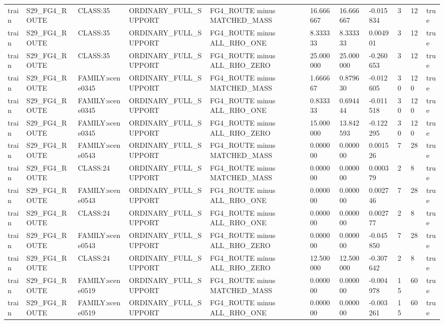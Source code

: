 \begin{tabular}{lllllllllll}
train & S29\_FG4\_ROUTE & CLASS:35 & ORDINARY\_FULL\_SUPPORT & FG4\_ROUTE minus MATCHED\_MASS & 16.666667 & 16.666667 & -0.015834 & 3 & 12 & true \\
train & S29\_FG4\_ROUTE & CLASS:35 & ORDINARY\_FULL\_SUPPORT & FG4\_ROUTE minus ALL\_RHO\_ONE & 8.333333 & 8.333333 & 0.004901 & 3 & 12 & true \\
train & S29\_FG4\_ROUTE & CLASS:35 & ORDINARY\_FULL\_SUPPORT & FG4\_ROUTE minus ALL\_RHO\_ZERO & 25.000000 & 25.000000 & -0.260653 & 3 & 12 & true \\
train & S29\_FG4\_ROUTE & FAMILY:scene0345 & ORDINARY\_FULL\_SUPPORT & FG4\_ROUTE minus MATCHED\_MASS & 1.666667 & 0.879630 & -0.012605 & 30 & 120 & true \\
train & S29\_FG4\_ROUTE & FAMILY:scene0345 & ORDINARY\_FULL\_SUPPORT & FG4\_ROUTE minus ALL\_RHO\_ONE & 0.833333 & 0.694444 & -0.011518 & 30 & 120 & true \\
train & S29\_FG4\_ROUTE & FAMILY:scene0345 & ORDINARY\_FULL\_SUPPORT & FG4\_ROUTE minus ALL\_RHO\_ZERO & 15.000000 & 13.842593 & -0.122295 & 30 & 120 & true \\
train & S29\_FG4\_ROUTE & FAMILY:scene0543 & ORDINARY\_FULL\_SUPPORT & FG4\_ROUTE minus MATCHED\_MASS & 0.000000 & 0.000000 & 0.001526 & 7 & 28 & true \\
train & S29\_FG4\_ROUTE & CLASS:24 & ORDINARY\_FULL\_SUPPORT & FG4\_ROUTE minus MATCHED\_MASS & 0.000000 & 0.000000 & 0.000379 & 2 & 8 & true \\
train & S29\_FG4\_ROUTE & FAMILY:scene0543 & ORDINARY\_FULL\_SUPPORT & FG4\_ROUTE minus ALL\_RHO\_ONE & 0.000000 & 0.000000 & 0.002746 & 7 & 28 & true \\
train & S29\_FG4\_ROUTE & CLASS:24 & ORDINARY\_FULL\_SUPPORT & FG4\_ROUTE minus ALL\_RHO\_ONE & 0.000000 & 0.000000 & 0.002777 & 2 & 8 & true \\
train & S29\_FG4\_ROUTE & FAMILY:scene0543 & ORDINARY\_FULL\_SUPPORT & FG4\_ROUTE minus ALL\_RHO\_ZERO & 0.000000 & 0.000000 & -0.045850 & 7 & 28 & true \\
train & S29\_FG4\_ROUTE & CLASS:24 & ORDINARY\_FULL\_SUPPORT & FG4\_ROUTE minus ALL\_RHO\_ZERO & 12.500000 & 12.500000 & -0.307642 & 2 & 8 & true \\
train & S29\_FG4\_ROUTE & FAMILY:scene0519 & ORDINARY\_FULL\_SUPPORT & FG4\_ROUTE minus MATCHED\_MASS & 0.000000 & 0.000000 & -0.004978 & 15 & 60 & true \\
train & S29\_FG4\_ROUTE & FAMILY:scene0519 & ORDINARY\_FULL\_SUPPORT & FG4\_ROUTE minus ALL\_RHO\_ONE & 0.000000 & 0.000000 & -0.003261 & 15 & 60 & true \\

\end{tabular}
